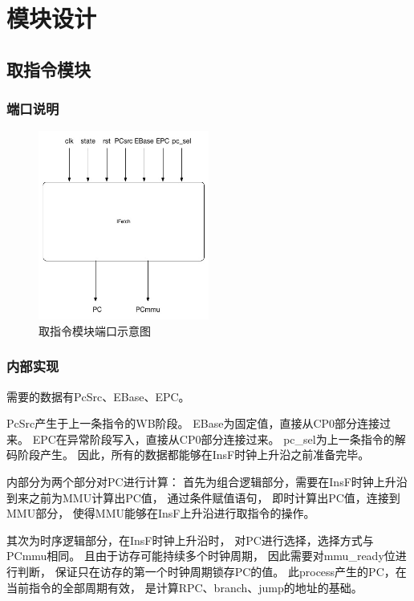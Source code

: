 \section{模块设计}
    \subsection{取指令模块}
        \subsubsection{端口说明}
             

            \begin{figure}[!hbp]
                \centering
                \caption{取指令模块端口示意图}
                \includegraphics[width=0.5\textwidth]{chart/ifetch.jpg}
            \end{figure}
        \subsubsection{内部实现}
            需要的数据有PcSrc、EBase、EPC。

            PcSrc产生于上一条指令的WB阶段。%
            EBase为固定值，直接从CP0部分连接过来。%
            EPC在异常阶段写入，直接从CP0部分连接过来。%
            pc\_sel为上一条指令的解码阶段产生。%
            因此，所有的数据都能够在InsF时钟上升沿之前准备完毕。

            内部分为两个部分对PC进行计算：%
            首先为组合逻辑部分，需要在InsF时钟上升沿到来之前为MMU计算出PC值，%
            通过条件赋值语句，%
            即时计算出PC值，连接到MMU部分，%
            使得MMU能够在InsF上升沿进行取指令的操作。%

            其次为时序逻辑部分，在InsF时钟上升沿时，%
            对PC进行选择，选择方式与PCmmu相同。%
            且由于访存可能持续多个时钟周期，%
            因此需要对mmu\_ready位进行判断，%
            保证只在访存的第一个时钟周期锁存PC的值。%
            此process产生的PC，在当前指令的全部周期有效，%
            是计算RPC、branch、jump的地址的基础。%

